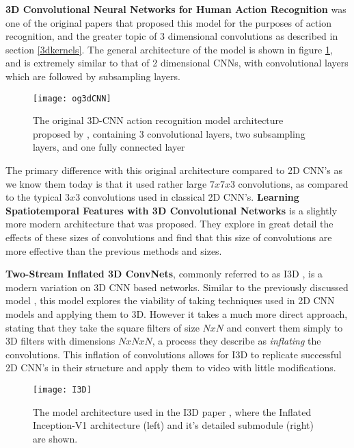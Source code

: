 \textbf{3D Convolutional Neural Networks for Human Action Recognition} \cite{3DCNN-ActionRecognition} was one of the original papers that proposed this model for the purposes of action recognition, and the greater topic of 3 dimensional convolutions as described in section \ref{3dkernels}. The general architecture of the model is shown in figure \ref{fig:original3dcnn}, and is extremely similar to that of 2 dimensional CNNs, with convolutional layers which are followed by subsampling layers.

\begin{figure}[ht]
	\texttt{[image: og3dCNN]}
	\centering
	\caption{The original 3D-CNN action recognition model architecture proposed by \cite{3DCNN-ActionRecognition}, containing 3 convolutional layers, two subsampling layers, and one fully connected layer}
	\label{fig:original3dcnn}
\end{figure}

The primary difference with this original architecture compared to 2D CNN's as we know them today is that it used rather large $7x7x3$ convolutions, as compared to the typical $3x3$ convolutions used in classical 2D CNN's. \textbf{Learning Spatiotemporal Features with 3D Convolutional Networks} \cite{3x33dcnn} is a slightly more modern architecture that was proposed. They explore in great detail the effects of these sizes of convolutions and find that this size of convolutions are more effective than the previous methods and sizes.

\textbf{Two-Stream Inflated 3D ConvNets}, commonly referred to as I3D \cite{i3d}, is a modern variation on 3D CNN based networks. Similar to the previously discussed model \cite{3DCNN-ActionRecognition}, this model explores the viability of taking techniques used in 2D CNN models and applying them to 3D. However it takes a much more direct approach, stating that they take the square filters of size $NxN$ and convert them simply to 3D filters with dimensions $NxNxN$, a process they describe as \textit{inflating} the convolutions. This inflation of convolutions allows for I3D to replicate successful 2D CNN's in their structure and apply them to video with little modifications.

\begin{figure}[ht]
	\texttt{[image: I3D]}
	\centering
	\caption{The model architecture used in the I3D paper \cite{i3d}, where the Inflated Inception-V1 architecture (left) and it's detailed submodule (right) are shown.}
	\label{fig:I3D}
\end{figure}

